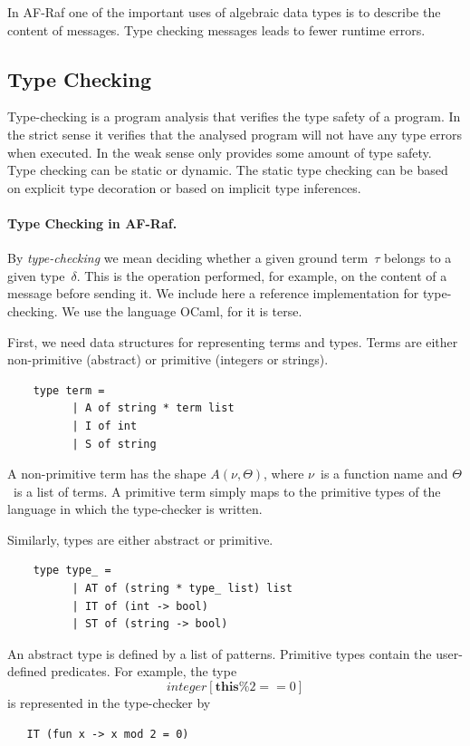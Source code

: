 \documentclass[a4paper,12pt,oneside,fleqn]{book} %
\begin{document}
In AF-Raf one of the important uses of algebraic data types is to describe the content of
messages. Type checking messages leads to fewer runtime errors.

\subsection{Type Checking}\label{sec:concepts-adt-check} %
Type-checking is a program analysis that verifies the type safety of a
program. In the strict sense it verifies that the analysed program
will not have any type errors when executed. In the weak sense only
provides some amount of type safety. Type checking can be static or
dynamic. The static type checking can be based on explicit type decoration
or based on implicit type inferences.


\paragraph{Type Checking in AF-Raf.}
By \emph{type-checking} we mean deciding whether a given ground term~$\tau$
belongs to a given type~$\delta$. This is the operation performed, for
example, on the content of a message before sending it. We include here a
reference implementation for type-checking. We use the language OCaml, for
it is terse.

First, we need data structures for representing terms and types. Terms are
either non-primitive (abstract) or primitive (integers or strings).
\begin{verbatim}
    type term =
          | A of string * term list
          | I of int
          | S of string
\end{verbatim}
A non-primitive term has the shape $A(\nu,\Theta)$, where $\nu$~is a
function name and $\Theta$~is a list of terms. A primitive term simply maps
to the primitive types of the language in which the type-checker is
written.

Similarly, types are either abstract or primitive.
\begin{verbatim}
    type type_ =
          | AT of (string * type_ list) list
          | IT of (int -> bool)
          | ST of (string -> bool)
\end{verbatim}
An abstract type is defined by a list of patterns. Primitive types contain the
user-defined predicates. For example, the type
\[\mathit{integer}[\mathbf{this}\%2==0]\] is represented in the type-checker by
\begin{verbatim}
   IT (fun x -> x mod 2 = 0)
\end{verbatim}
\end{document}
